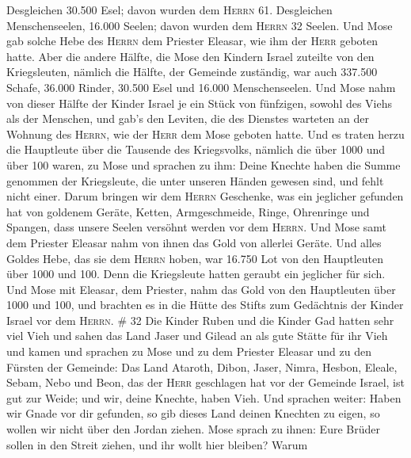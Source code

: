 Desgleichen 30.500 Esel; davon wurden dem \textsc{Herrn} 61.
 Desgleichen Menschenseelen, 16.000 Seelen; davon wurden
dem \textsc{Herrn} 32 Seelen.  Und Mose gab solche Hebe
des \textsc{Herrn} dem Priester Eleasar, wie ihm der \textsc{Herr}
geboten hatte.  Aber die andere Hälfte, die Mose den
Kindern Israel zuteilte von den Kriegsleuten,  nämlich
die Hälfte, der Gemeinde zuständig, war auch 337.500 Schafe,
 36.000 Rinder,  30.500 Esel
 und 16.000 Menschenseelen.  Und Mose nahm
von dieser Hälfte der Kinder Israel je ein Stück von fünfzigen, sowohl
des Viehs als der Menschen, und gab's den Leviten, die des Dienstes
warteten an der Wohnung des \textsc{Herrn}, wie der \textsc{Herr} dem
Mose geboten hatte.  Und es traten herzu die Hauptleute
über die Tausende des Kriegsvolks, nämlich die über 1000 und über 100
waren, zu Mose  und sprachen zu ihm: Deine Knechte haben
die Summe genommen der Kriegsleute, die unter unseren Händen gewesen
sind, und fehlt nicht einer.  Darum bringen wir dem
\textsc{Herrn} Geschenke, was ein jeglicher gefunden hat von goldenem
Geräte, Ketten, Armgeschmeide, Ringe, Ohrenringe und Spangen, dass
unsere Seelen versöhnt werden vor dem \textsc{Herrn}. 
Und Mose samt dem Priester Eleasar nahm von ihnen das Gold von allerlei
Geräte.  Und alles Goldes Hebe, das sie dem
\textsc{Herrn} hoben, war 16.750 Lot von den Hauptleuten über 1000 und
100.  Denn die Kriegsleute hatten geraubt ein jeglicher
für sich.  Und Mose mit Eleasar, dem Priester, nahm das
Gold von den Hauptleuten über 1000 und 100, und brachten es in die Hütte
des Stifts zum Gedächtnis der Kinder Israel vor dem \textsc{Herrn}. \#
32  Die Kinder Ruben und die Kinder Gad hatten sehr viel
Vieh und sahen das Land Jaser und Gilead an als gute Stätte für ihr Vieh
 und kamen und sprachen zu Mose und zu dem Priester
Eleasar und zu den Fürsten der Gemeinde:  Das Land
Ataroth, Dibon, Jaser, Nimra, Hesbon, Eleale, Sebam, Nebo und Beon,
 das der \textsc{Herr} geschlagen hat vor der Gemeinde
Israel, ist gut zur Weide; und wir, deine Knechte, haben Vieh.
 Und sprachen weiter: Haben wir Gnade vor dir gefunden, so
gib dieses Land deinen Knechten zu eigen, so wollen wir nicht über den
Jordan ziehen.  Mose sprach zu ihnen: Eure Brüder sollen
in den Streit ziehen, und ihr wollt hier bleiben?  Warum
